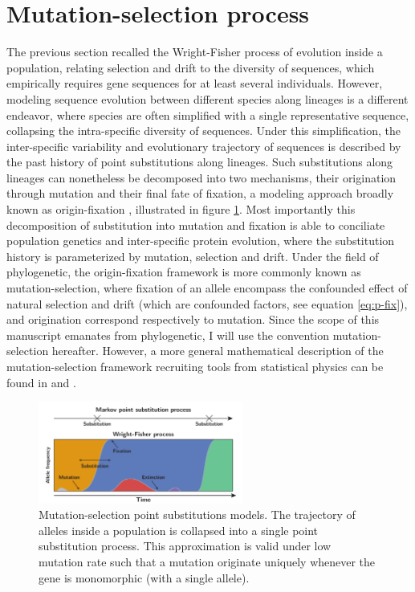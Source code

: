 \section{Mutation-selection process}
The previous section recalled the Wright-Fisher process of evolution inside a population, relating selection and drift to the diversity of sequences, which empirically requires gene sequences for at least several individuals.
However, modeling sequence evolution between different species along lineages is a different endeavor, where species are often simplified with a single representative sequence, collapsing the intra-specific diversity of sequences.
Under this simplification, the inter-specific variability and evolutionary trajectory of sequences is described by the past history of point substitutions along lineages.
Such substitutions along lineages can nonetheless be decomposed into two mechanisms, their origination through mutation and their final fate of fixation, a modeling approach broadly known as origin-fixation \citep{McCandlish2014}, illustrated in figure \ref{fig:point-process}.
Most importantly this decomposition of \gls{substitution} into mutation and fixation is able to conciliate population genetics and inter-specific protein evolution, where the \gls{substitution} history is parameterized by mutation, selection and drift.
Under the field of phylogenetic, the origin-fixation framework is more commonly known as mutation-selection, where fixation of an \gls{allele} encompass the confounded effect of natural selection and drift (which are confounded factors, see equation \ref{eq:p-fix}), and origination correspond respectively to mutation.
Since the scope of this manuscript emanates from phylogenetic, I will use the convention mutation-selection hereafter.
However, a more general mathematical description of the mutation-selection framework recruiting tools from statistical physics can be found in \citet{Sella2005} and \citet{Mustonen2009}.

\begin{figure}[H]
	\centering
	\includegraphics[width=0.6\textwidth]{figures/point-process.pdf}
	\caption[Mutation-selection point substitutions]{Mutation-selection point substitutions models. The trajectory of alleles inside a population is collapsed into a single point \gls{substitution} process. This approximation is valid under low mutation rate such that a mutation originate uniquely whenever the gene is monomorphic (with a single allele).}
	\label{fig:point-process}
\end{figure}


